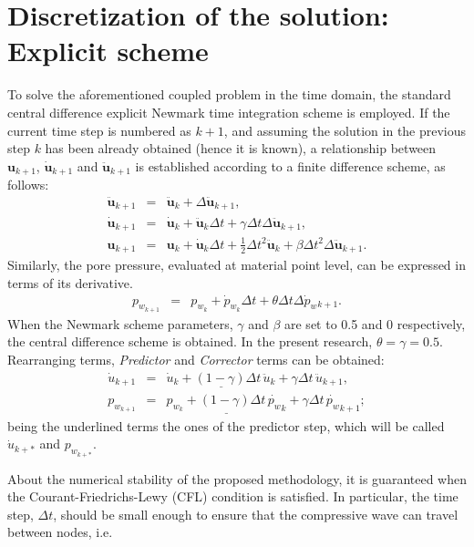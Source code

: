 \documentclass[twocolumn]{svjour3}          %
\begin{document}
\section{Discretization of the solution: Explicit scheme}
\label{sec:4}
To solve the aforementioned coupled problem in the time domain, the standard central difference explicit Newmark time integration scheme is employed. If the current time step is numbered as $k+1$, and assuming the solution in the previous step $k$ has been already obtained (hence it is known), a relationship between $\textbf{u}_{k+1}$, $\dot{\textbf{u}}_{k+1}$ and $\ddot{\textbf{u}}_{k+1}$ is established according to a finite difference scheme, as follows: 
\begin{eqnarray}
\ddot{\boldsymbol{u}}_{k+1} &=&\ddot{\boldsymbol{u}}_{k}+\Delta \ddot{\boldsymbol{u}}_{k+1},  \nonumber \\
\dot{\boldsymbol{u}}_{k+1} &=&\dot{\boldsymbol{u}}_k+\ddot{\boldsymbol{u}}_{k}\Delta t+\gamma \Delta t \Delta \ddot{\boldsymbol{u}}_{k+1}, \nonumber \\
\boldsymbol{u}_{k+1}&=&\boldsymbol{u}_{k}+\dot{\boldsymbol{u}}_{k} \Delta t+\frac{1}{2} \Delta t^{2} \ddot{\boldsymbol{u}}_{k}+\beta\Delta t^{2}\Delta \ddot{\boldsymbol{u}}_{k+1}. \label{eq_Nw}
\end{eqnarray}
Similarly, the pore pressure, evaluated at material point level, can be expressed in terms of its derivative.
\begin{eqnarray}
p_{w_{k+1}} &=&p_{w_k}+\dot{p}_{w_k}\Delta t+\theta \Delta t \Delta \dot{p}_w{_{k+1}}.  \label{eq_Nw_p}
\end{eqnarray}
When the Newmark scheme parameters, $\gamma$ and $\beta$ are set to 0.5 and 0 respectively, the central difference scheme is obtained. In the present research, $\theta=\gamma=0.5$. Rearranging terms, \textit{Predictor} and \textit{Corrector} terms can be obtained:
\begin{eqnarray}
\dot{u}_{k+1}&=&\underline{\dot{u}_{k}+(1-\gamma)\Delta t \,  \ddot{u}_{k}} + \gamma \Delta t \,  \ddot{u}_{k+1} \label{pc_1}, \\
p_{w_{k+1}}&=&\underline{p_{w_{k}}+(1-\gamma)\Delta t \,  \dot{p_w}_{k}} + \gamma \Delta t \,  \dot{p_w}_{k+1} \label{pc_2};
\end{eqnarray}
being the underlined terms the ones of the predictor step, which will be called $\dot{u}_{k+*}$ and $p_{w_{k+*}}$.

About the numerical stability of the proposed methodology, it is guaranteed when the Courant-Friedrichs-Lewy (CFL) condition is satisfied. In particular, the time step, $\Delta t$, should be small enough to ensure that the compressive wave can travel between nodes, i.e. 
\end{document}
